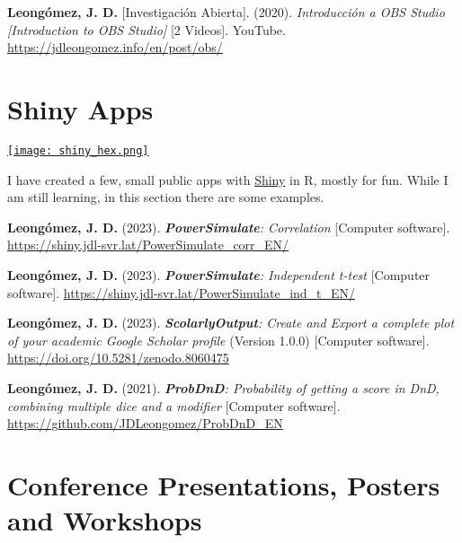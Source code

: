 \documentclass[11pt,a4paper,]{awesome-cv}
\begin{document}
\textbf{Leongómez, J. D.} {[}Investigación Abierta{]}. (2020).
\emph{Introducción a OBS Studio {[}Introduction to OBS Studio{]}} {[}2
Videos{]}. YouTube. \url{https://jdleongomez.info/en/post/obs/}

\endgroup

\hypertarget{shiny-apps}{%
\section{Shiny Apps}\label{shiny-apps}}

\begin{minipage}[c]{0.10\linewidth}
\href{https://jdleongomez.info/en/#shiny}{\texttt{[image: shiny\_hex.png]}}
\end{minipage} \begin{minipage}[c]{0.90\linewidth}
I have created a few, small public apps with \href{https://shiny.posit.co/}{Shiny} in R, mostly for fun. While I am still learning, in this section there are some examples.
\end{minipage}

\begingroup
\footnotesize
\setlength{\parindent}{-0.5in}
\setlength{\leftskip}{0.5in}

\textbf{Leongómez, J. D.} (2023). \emph{\textbf{PowerSimulate}:
Correlation} {[}Computer software{]}.
\url{https://shiny.jdl-svr.lat/PowerSimulate_corr_EN/}

\textbf{Leongómez, J. D.} (2023). \emph{\textbf{PowerSimulate}:
Independent t-test} {[}Computer software{]}.
\url{https://shiny.jdl-svr.lat/PowerSimulate_ind_t_EN/}

\textbf{Leongómez, J. D.} (2023). \emph{\textbf{ScolarlyOutput}: Create
and Export a complete plot of your academic Google Scholar profile}
(Version 1.0.0) {[}Computer software{]}.
\href{https://github.com/JDLeongomez/ScholarlyOutput}{https://doi.org/10.5281/zenodo.8060475}

\textbf{Leongómez, J. D.} (2021). \emph{\textbf{ProbDnD}: Probability of
getting a score in DnD, combining multiple dice and a modifier}
{[}Computer software{]}. \url{https://github.com/JDLeongomez/ProbDnD_EN}

\endgroup

\hypertarget{conference-presentations-posters-and-workshops}{%
\section{Conference Presentations, Posters and
Workshops}\label{conference-presentations-posters-and-workshops}}
\end{document}
